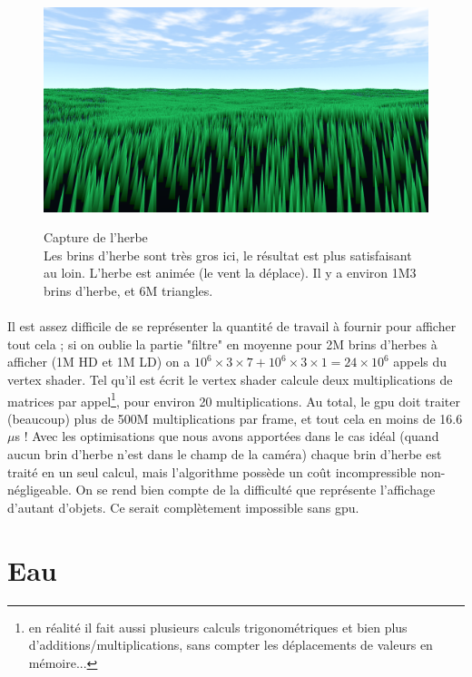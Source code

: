\documentclass{EPUProjetDi}
\begin{document}
\begin{figure}[H]
	\centering
	\caption[Capture de l'herbe]{Capture de l'herbe\\Les brins d'herbe sont très gros ici, le résultat est plus satisfaisant au loin. L'herbe est animée (le vent la déplace). Il y a environ 1M3 brins d'herbe, et 6M triangles.}
	\includegraphics[scale=.35]{grass}
	\label{fig:grass}
\end{figure}

\paragraph{}
Il est assez difficile de se représenter la quantité de travail à fournir pour afficher tout cela ; si on oublie la partie "filtre" en moyenne pour 2M brins d'herbes à afficher (1M HD et 1M LD) on a $10^6\times3\times7 + 10^6\times3\times1=24\times10^6$ appels du vertex shader. Tel qu'il est écrit le vertex shader calcule deux multiplications de matrices par appel\footnote{en réalité il fait aussi plusieurs calculs trigonométriques et bien plus d'additions/multiplications, sans compter les déplacements de valeurs en mémoire...}, pour environ 20 multiplications. Au total, le gpu doit traiter (beaucoup) plus de 500M multiplications par frame, et tout cela en moins de 16.6$\mu$s ! Avec les optimisations que nous avons apportées dans le cas idéal (quand aucun brin d'herbe n'est dans le champ de la caméra) chaque brin d'herbe est traité en un seul calcul, mais l'algorithme possède un coût incompressible non-négligeable. On se rend bien compte de la difficulté que représente l'affichage d'autant d'objets. Ce serait complètement impossible sans gpu.

\section{Eau}
\end{document}
